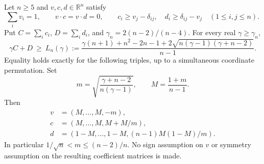 \begin{lemma}
\label{lem:r76-simultaneous-positivity}
Let $n\ge5$ and $v,c,d\in\mathbb R^n$ satisfy
\[
 \sum_i v_i=1,\qquad v\cdot c=v\cdot d=0,\qquad
 c_i\ge v_j-\delta_{ij},\quad d_i\ge\delta_{ij}-v_j
 \quad(1\le i,j\le n).
\]
Put $C=\sum_i c_i$, $D=\sum_i d_i$, and
$\gamma_n=2(n-2)/(n-4)$. For every real $\gamma\ge\gamma_n$,
\begin{equation}\label{eq:r76-weighted-positive-bound}
 \gamma C+D\ \ge\ L_n(\gamma):=
 \frac{\gamma(n+1)+n^2-2n-1+
             2\sqrt{n(\gamma-1)(\gamma+n-2)}}{n-1}.
\end{equation}
Equality holds exactly for the following triples, up to a simultaneous
coordinate permutation. Set
\[
 m=\sqrt{\frac{\gamma+n-2}{n(\gamma-1)}},\qquad
 M=\frac{1+m}{n-1}.
\]
Then
\begin{equation}\label{eq:r76-weighted-equality}
 \begin{split}
 v&=(M,\ldots,M,-m),\\
 c&=(M,\ldots,M,M+M/m),\\
 d&=(1-M,\ldots,1-M,(n-1)M(1-M)/m).
 \end{split}
\end{equation}
In particular $1/\sqrt n<m\le(n-2)/n$. No sign assumption on $v$
or symmetry assumption on the resulting coefficient matrices is made.
\end{lemma}
